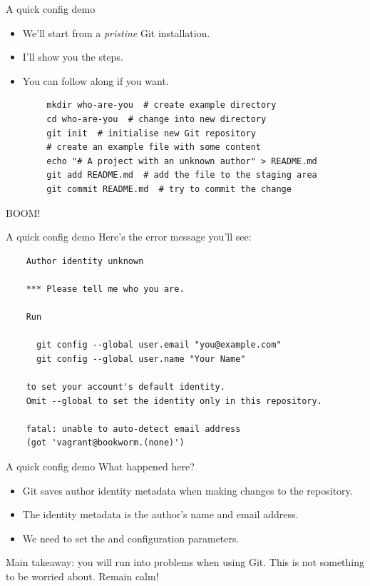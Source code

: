 \documentclass{git_course}
\begin{document}
\begin{frame}[fragile]{A quick config demo}
    \begin{itemize}
        \item We'll start from a \emph{pristine} Git installation.
        \item I'll show you the steps.
        \item You can follow along if you want.
    \end{itemize}
    \begin{verbatim}
        mkdir who-are-you  # create example directory
        cd who-are-you  # change into new directory
        git init  # initialise new Git repository
        # create an example file with some content
        echo "# A project with an unknown author" > README.md
        git add README.md  # add the file to the staging area
        git commit README.md  # try to commit the change
    \end{verbatim}
    BOOM!  
\end{frame}

\begin{frame}[fragile]{A quick config demo}
    Here's the error message you'll see:
    \begin{verbatim}
    Author identity unknown

    *** Please tell me who you are.

    Run

      git config --global user.email "you@example.com"
      git config --global user.name "Your Name"

    to set your account's default identity.
    Omit --global to set the identity only in this repository.

    fatal: unable to auto-detect email address
    (got 'vagrant@bookworm.(none)')
    \end{verbatim}
\end{frame}

\begin{frame}[fragile]{A quick config demo}
    What happened here?

    \begin{itemize}
        \item Git saves author identity metadata when making changes to the
            repository.
        \item The identity metadata is the author's name and email address.
        \item We need to set the  and 
            configuration parameters.
    \end{itemize}

    Main takeaway: you will run into problems when using Git.  This is not
    something to be worried about.  Remain calm!
\end{frame}
\end{document}
